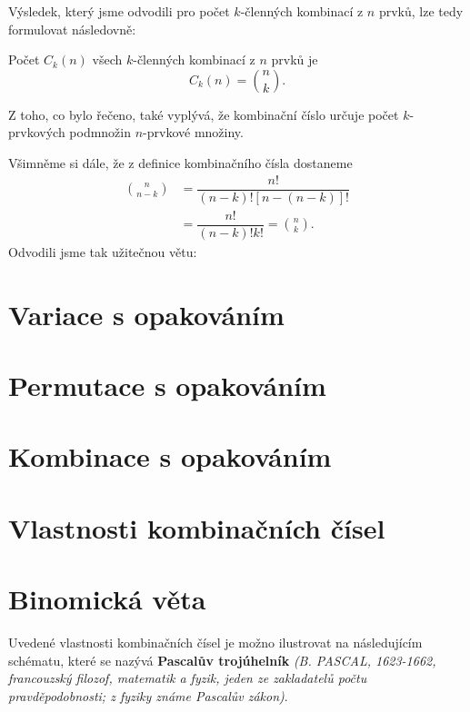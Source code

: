     Výsledek, který jsme odvodili pro počet \(k\)-členných kombinací z \(n\) prvků, lze tedy
    formulovat následovně:
    \begin{mdframed}[style=highlight] Počet \(C_k(n)\) všech \(k\)-členných kombinací z \(n\) prvků
      je 
      \begin{equation*}
        C_k(n) = \binom{n}{k}.
      \end{equation*}  
    \end{mdframed}     
    
    Z toho, co bylo řečeno, také vyplývá, že kombinační číslo určuje počet \(k\)-prvkových podmnožin
    \(n\)-prvkové množiny.

    Všimněme si dále, že z definice kombinačního čísla dostaneme
    \begin{align*}
      \binom{n}{n-k} &= \dfrac{n!}{(n-k)![n-(n-k)]!}             \\
                      &= \dfrac{n!}{(n-k)!k!} = \binom{n}{k}.
    \end{align*}  
    Odvodili jsme tak užitečnou větu:


  \section{Variace s opakováním}\label{mai:IchapIVcsecV}
  \section{Permutace s opakováním}\label{mai:IchapIVcsecVI}
  \section{Kombinace s opakováním}\label{mai:IchapIVcsecVII}
  \section{Vlastnosti kombinačních čísel}\label{mai:IchapIVcsecVIII}
  \section{Binomická věta}\label{mai:IchapIVcsecIX}    
  
    Uvedené vlastnosti kombinačních čísel je možno ilustrovat na následujícím schématu, které se
    nazývá \textbf{Pascalův trojúhelník} \emph{(B. PASCAL, 1623-1662, francouzský filozof, matematik
    a fyzik, jeden ze zakladatelů počtu pravděpodobnosti; z fyziky známe Pascalův zákon)}.

